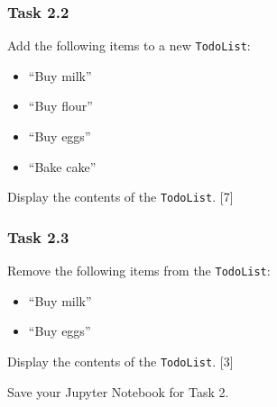 \subsubsection*{Task 2.2 }

Add the following items to a new \texttt{TodoList}: 
\begin{itemize}
\item \textquotedblleft Buy milk\textquotedblright{} 
\item \textquotedblleft Buy flour\textquotedblright{} 
\item \textquotedblleft Buy eggs\textquotedblright{}
\item \textquotedblleft Bake cake\textquotedblright{} 
\end{itemize}
Display the contents of the \texttt{TodoList}. \hfill{}{[}7{]}

\subsubsection*{Task 2.3 }

Remove the following items from the \texttt{TodoList}: 
\begin{itemize}
\item \textquotedblleft Buy milk\textquotedblright{} 
\item \textquotedblleft Buy eggs\textquotedblright{} 
\end{itemize}
Display the contents of the \texttt{TodoList}. \hfill{}{[}3{]}

Save your Jupyter Notebook for Task 2.